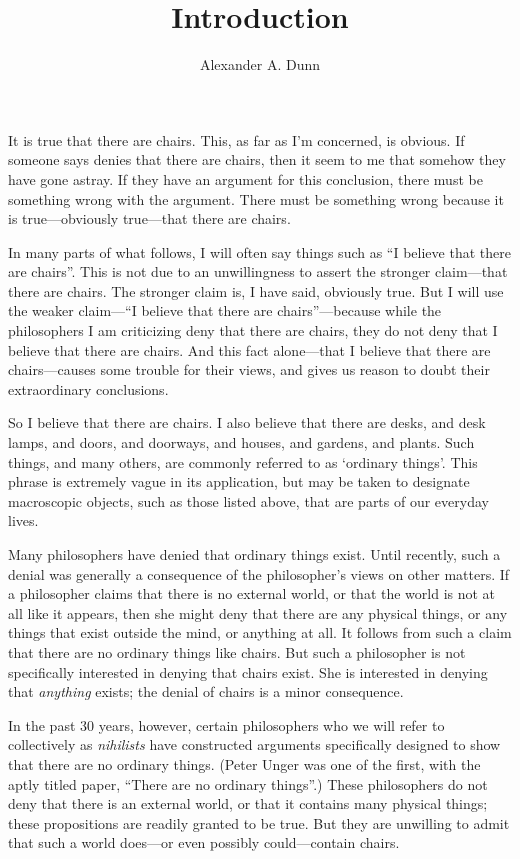 \documentclass[11pt]{article}
\title{Introduction}
\author{Alexander A. Dunn}
\begin{document}
\ifstandalone
\maketitle
\begin{spacing}{1.5}
\fi

It is true that there are chairs.  This, as far as I'm concerned, is
obvious.  If someone says denies that there are chairs, then it seem
to me that somehow they have gone astray.  If they have an argument
for this conclusion, there must be something wrong with the argument.
There must be something wrong because it is true---obviously
true---that there are chairs.

In many parts of what follows, I will often say things such as ``I
believe that there are chairs''.  This is not due to an unwillingness
to assert the stronger claim---that there are chairs.  The stronger
claim is, I have said, obviously true.  But I will use the weaker
claim---``I believe that there are chairs''---because while the
philosophers I am criticizing deny that there are chairs, they do not
deny that I believe that there are chairs.  And this fact alone---that
I believe that there are chairs---causes some trouble for their views,
and gives us reason to doubt their extraordinary conclusions.

So I believe that there are chairs.  I also believe that there are
desks, and desk lamps, and doors, and doorways, and houses, and
gardens, and plants.  Such things, and many others, are commonly
referred to as `ordinary things'.  This phrase is extremely vague in
its application, but may be taken to designate macroscopic objects,
such as those listed above, that are parts of our everyday lives.

Many philosophers have denied that ordinary things exist.  Until
recently, such a denial was generally a consequence of the
philosopher's views on other matters.  If a philosopher claims that
there is no external world, or that the world is not at all like it
appears, then she might deny that there are any physical things, or
any things that exist outside the mind, or anything at all.  It
follows from such a claim that there are no ordinary things like
chairs.  But such a philosopher is not specifically interested in
denying that chairs exist.  She is interested in denying that {\em
  anything} exists; the denial of chairs is a minor consequence.

In the past 30 years, however, certain philosophers who we will refer
to collectively as {\em nihilists} have constructed arguments
specifically designed to show that there are no ordinary things.
(Peter Unger was one of the first, with the aptly titled paper,
``There are no ordinary things''.)  These philosophers do not deny
that there is an external world, or that it contains many physical
things; these propositions are readily granted to be true.  But they
are unwilling to admit that such a world does---or even possibly
could---contain chairs.


\end{spacing}
\end{document}
